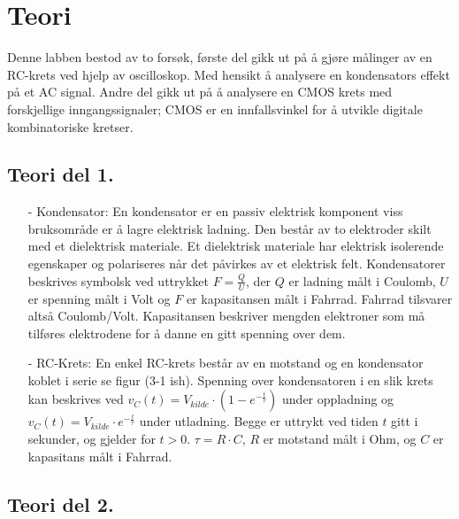 \section{Teori}

Denne labben bestod av to forsøk, første del gikk ut på å gjøre målinger av en RC-krets ved hjelp av oscilloskop.
Med hensikt å analysere en kondensators effekt på et AC signal.
Andre del gikk ut på å analysere en CMOS krets med forskjellige inngangssignaler;
CMOS er en innfallsvinkel for å utvikle digitale kombinatoriske kretser.

\subsection{Teori del 1.}

    \begin{itemize}
        \item[-] Kondensator: En kondensator er en passiv elektrisk komponent viss bruksområde er å lagre elektrisk ladning.
        Den består av to elektroder skilt med et dielektrisk materiale.
        Et dielektrisk materiale har elektrisk isolerende egenskaper og polariseres når det påvirkes av et elektrisk felt.
        Kondensatorer beskrives symbolsk ved uttrykket $F = \frac{Q}{U}$, der $Q$ er ladning målt i Coulomb, $U$ er spenning målt i Volt og $F$ er kapasitansen målt i Fahrrad.
        Fahrrad tilsvarer altså Coulomb/Volt.
        Kapasitansen beskriver mengden elektroner som må tilføres elektrodene for å danne en gitt spenning over dem.
        \item[-] RC-Krets: En enkel RC-krets består av en motstand og en kondensator koblet i serie se figur (3-1 ish).
        Spenning over kondensatoren i en slik krets kan beskrives ved $v_{C}(t) = V_{kilde} \cdot \left( 1 - e^{-\frac{t}{\tau}} \right)$ under oppladning og $v_{C}(t) = V_{kilde} \cdot e^{-\frac{t}{\tau}}$ under utladning.
        Begge er uttrykt ved tiden $t$ gitt i sekunder, og gjelder for $t > 0$.
        $\tau = R \cdot C$, $R$ er motstand målt i Ohm, og $C$ er kapasitans målt i Fahrrad.
    \end{itemize}

\subsection{Teori del 2.}

